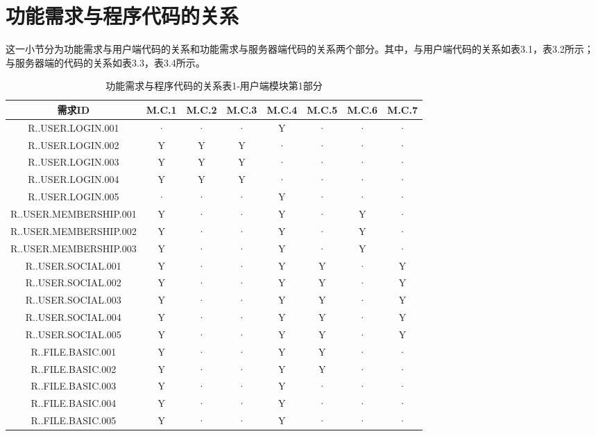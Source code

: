 \section{功能需求与程序代码的关系}
这一小节分为功能需求与用户端代码的关系和功能需求与服务器端代码的关系两个部分。其中，与用户端代码的关系如表3.1，表3.2所示；与服务器端的代码的关系如表3.3，表3.4所示。
{ 
        \color{red}

    \begin{table}[htbp]
        \color{red}
\centering
\caption{功能需求与程序代码的关系表1-用户端模块第1部分} \label{tab:requirement-module}
\begin{tabular}{|c|c|c|c|c|c||c|c|}
    \hline 
    需求ID & M.C.1 & M.C.2 & M.C.3 & M.C.4 & M.C.5 & M.C.6 & M.C.7\\
    \hline 
    R..USER.LOGIN.001 &· &· &· & Y  &· & ·  & ·\\
    \hline
    R..USER.LOGIN.002 & Y & Y &Y  &·  &· & · & ·\\
    \hline 
    R..USER.LOGIN.003 & Y & Y & Y &·  &· & · & ·\\
    \hline
    R..USER.LOGIN.004 & Y & Y & Y &·   &· & · & ·\\
    \hline
    R..USER.LOGIN.005 &· &· &· & Y  &· & · & ·\\
    \hline
    R..USER.MEMBERSHIP.001 &Y &· &· & Y  &· &Y & ·\\
    \hline
    R..USER.MEMBERSHIP.002 & Y & · &·  &Y  &· &Y & ·\\
    \hline   
    R..USER.MEMBERSHIP.003 & Y & · & · &Y  &· &Y & ·\\
    \hline
    R..USER.SOCIAL.001 &Y &· &· & Y  &Y & · & Y\\
    \hline
    R..USER.SOCIAL.002 & Y & · &·  &Y  &Y & · & Y\\
    \hline 
    R..USER.SOCIAL.003 & Y & · & · &Y  &Y & · & Y\\
    \hline
    R..USER.SOCIAL.004 & Y & · & · &Y   &Y & · & Y\\
    \hline
    R..USER.SOCIAL.005 &Y &· &· & Y  &Y & · & Y\\
    \hline
    R..FILE.BASIC.001 & Y &· &· & Y  & Y & · & ·\\
    \hline
    R..FILE.BASIC.002 & Y &· &· &  Y & Y & · & ·\\
    \hline 
    R..FILE.BASIC.003 & Y  &·  & · &Y   &· & · & ·\\
    \hline
    R..FILE.BASIC.004 & Y  &·  & · &Y  &· & · & ·\\
    \hline     
    R..FILE.BASIC.005 & Y  &·  & · &Y  &· & · & ·\\

\end{tabular}
\end{table}}
